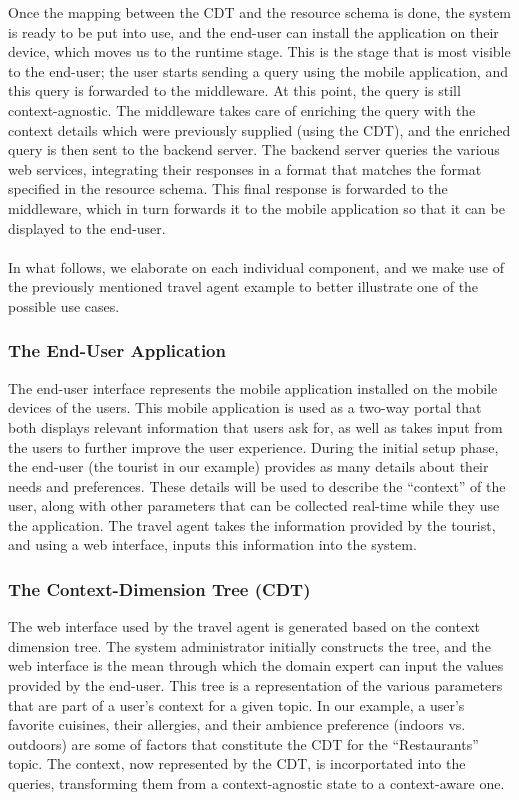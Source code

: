 Once the mapping between the CDT and the resource schema is done, the system is ready to be put into use, and the end-user can install the application on their device, which moves us to the runtime stage. This is the stage that is most visible to the end-user; the user starts sending a query using the mobile application, and this query is forwarded to the middleware. At this point, the query is still context-agnostic. The middleware takes care of enriching the query with the context details which were previously supplied (using the CDT), and the enriched query is then sent to the backend server. The backend server queries the various web services, integrating their responses in a format that matches the format specified in the resource schema. This final response is forwarded to the middleware, which in turn forwards it to the mobile application so that it can be displayed to the end-user.\\\\
In what follows, we elaborate on each individual component, and we make use of the previously mentioned travel agent example to better illustrate one of the possible use cases.
\subsubsection{The End-User Application}
The end-user interface represents the mobile application installed on the mobile devices of the users. This mobile application is used as a two-way portal that both displays relevant information that users ask for, as well as takes input from the users to further improve the user experience. During the initial setup phase, the end-user (the tourist in our example) provides as many details about their needs and preferences. These details will be used to describe the ``context'' of the user, along with other parameters that can be collected real-time while they use the application. The travel agent takes the information provided by the tourist, and using a web interface, inputs this information into the system.
\subsubsection{The Context-Dimension Tree (CDT)}
The web interface used by the travel agent is generated based on the context dimension tree. The system administrator initially constructs the tree, and the web interface is the mean through which the domain expert can input the values provided by the end-user. This tree is a representation of the various parameters that are part of a user's context for a given topic. In our example, a user's favorite cuisines, their allergies, and their ambience preference (indoors vs. outdoors) are some of factors that constitute the CDT for the ``Restaurants'' topic. The context, now represented by the CDT, is incorportated into the queries, transforming them from a context-agnostic state to a context-aware one.
